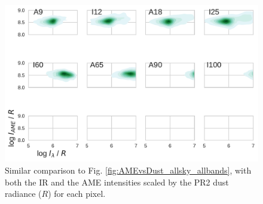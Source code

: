       \begin{figure}
        \label{fig:AMEtoRvsDusttoR_allsky_allbands}
        \includegraphics[width=150mm]{../Plots/AMEvsDust_allsky_allbands__mpsub_Rnorm_kde.pdf}
        \centering
        \caption{Similar comparison to Fig. \ref{fig:AMEvsDust_allsky_allbands}, with both the IR and the AME intensities scaled by the PR2 dust radiance ($R$) for each pixel. }
      \end{figure}

